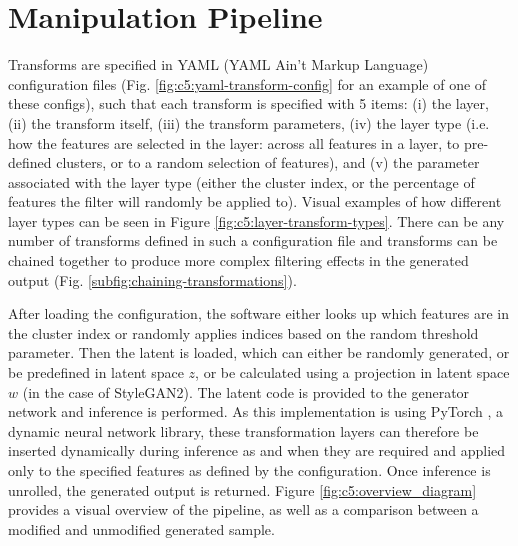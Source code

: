 \section{Manipulation Pipeline}

Transforms are specified in YAML (YAML Ain't Markup Language) configuration files \citep{ben2009yaml} (Fig. \ref{fig:c5:yaml-transform-config} for an example of one of these configs), such that each transform is specified with 5 items: (i) the layer, (ii) the transform itself, (iii) the transform parameters, (iv) the layer type (i.e. how the features are selected in the layer: across all features in a layer, to pre-defined clusters, or to a random selection of features), and (v) the parameter associated with the layer type (either the cluster index, or the percentage of features the filter will randomly be applied to). 
Visual examples of how different layer types can be seen in Figure \ref{fig:c5:layer-transform-types}.
There can be any number of transforms defined in such a configuration file and transforms can be chained together to produce more complex filtering effects in the generated output  (Fig. \ref{subfig:chaining-transformations}).

After loading the configuration, the software either looks up which features are in the cluster index or randomly applies indices based on the random threshold parameter. 
Then the latent is loaded, which can either be randomly generated, or be predefined in latent space $z$, or be calculated using a projection in latent space $w$ \citep{abdal2019image2stylegan,karras2019analyzing} (in the case of StyleGAN2). The latent code is provided to the generator network and inference is performed. 
As this implementation is using PyTorch \citep{paszke2019pytorch}, a dynamic neural network library, these transformation layers can therefore be inserted dynamically during inference as and when they are required and applied only to the specified features as defined by the configuration. 
Once inference is unrolled, the generated output is returned. Figure \ref{fig:c5:overview_diagram} provides a visual overview of the pipeline, as well as a comparison between a modified and unmodified generated sample.

